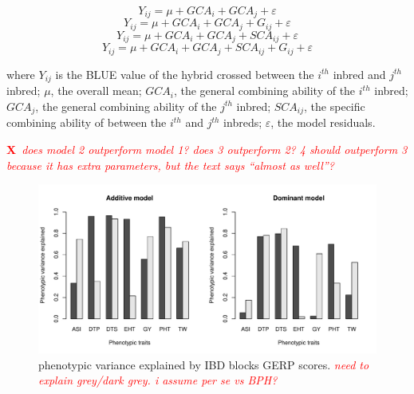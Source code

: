 \documentclass[9pt,twocolumn,twoside]{gsajnl}
\newcommand{\X}{\textcolor{red}{\bf X\,}}
\newcommand{\jri}[1]{\textcolor{red}{ \emph{ #1}} }
\begin{document}
\begin{equation}
Y_{ij} = \mu + GCA_{i} + GCA_{j} + \varepsilon
\label{eq:refname1}
\end{equation}
\begin{equation}
Y_{ij} = \mu + GCA_{i} + GCA_{j} +  G_{ij} + \varepsilon
\label{eq:refname2}
\end{equation}
\begin{equation}
Y_{ij} = \mu + GCA_{i} + GCA_{j} + SCA_{ij} + \varepsilon
\label{eq:refname3}
\end{equation}
\begin{equation}
Y_{ij} = \mu + GCA_{i} + GCA_{j} + SCA_{ij} + G_{ij} + \varepsilon
\label{eq:refname4}
\end{equation}
\DIFaddbegin 

\DIFaddend where 
$Y_{ij}$ is the BLUE value of the hybrid crossed between the $i^{th}$ inbred and $j^{th}$ inbred; 
$\mu$, the overall mean; 
$GCA_{i}$, the general combining ability of the $i^{th}$ inbred;
$GCA_{j}$, the general combining ability of the $j^{th}$ inbred;
$SCA_{ij}$, the specific combining ability of between the $i^{th}$ and $j^{th}$ inbreds;
$\varepsilon$, the model residuals.

\DIFaddbegin {}\emph{} \emph{} \X{}\jri{does model 2 outperform model 1? does 3 outperform 2? 4 should outperform 3 because it has extra parameters, but the text says ``almost as well''?}


\DIFaddend \begin{figure}[htbp]
\centering
\includegraphics[width=\linewidth]{Figure_h2.pdf}
\caption{\DIFdelbeginFL {}\DIFdelendFL \DIFaddbeginFL {}\DIFaddendFL phenotypic variance explained by IBD blocks \DIFdelbeginFL {}\DIFdelendFL \DIFaddbeginFL {}\DIFaddendFL GERP scores. \DIFaddbeginFL \jri{need to explain grey/dark grey. i assume per se vs BPH?}\DIFaddendFL }
\label{fig:h2}
\end{figure}
\end{document}
